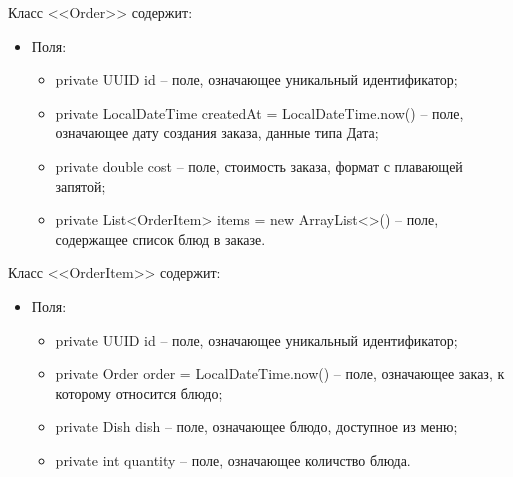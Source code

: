 \documentclass[a4paper,14pt]{extarticle}
\begin{document}
Класс <<Order>> содержит:
\begin{itemize}
  \item[--] Поля:
    \begin{itemize}
      \item[--] private UUID id -- поле, означающее уникальный идентификатор;
      \item[--] private LocalDateTime createdAt = LocalDateTime.now() -- поле, означающее дату создания заказа, данные типа Дата;
      \item[--] private double cost -- поле, стоимость заказа, формат с плавающей запятой;
      \item[--] private List<OrderItem> items = new ArrayList<>() -- поле, содержащее список блюд в заказе.
    \end{itemize}
\end{itemize}

Класс <<OrderItem>> содержит:
\begin{itemize}
  \item[--] Поля:
    \begin{itemize}
      \item[--] private UUID id -- поле, означающее уникальный идентификатор;
      \item[--] private Order order = LocalDateTime.now() -- поле, означающее заказ, к которому относится блюдо;
      \item[--] private Dish dish -- поле, означающее блюдо, доступное из меню;
      \item[--] private int quantity -- поле, означающее количство блюда.
    \end{itemize}
\end{itemize}
\end{document}
